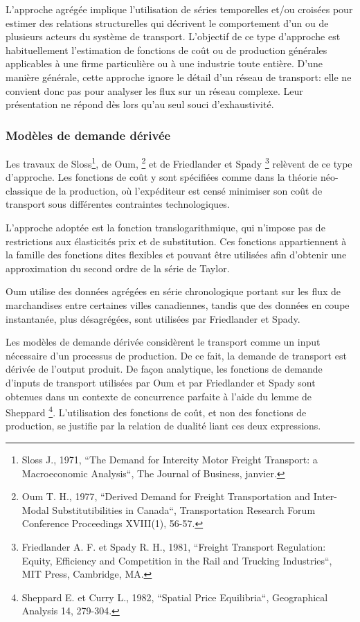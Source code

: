L'approche agrégée implique l'utilisation de séries temporelles
et/ou croisées pour estimer des relations structurelles qui
décrivent le comportement d'un ou de plusieurs acteurs du système
de transport. L'objectif de ce type d'approche est habituellement
l'estimation de fonctions de coût ou de production générales
applicables à une firme particulière ou à une industrie toute
entière. D'une manière générale, cette approche ignore le détail
d'un réseau de transport: elle ne convient donc pas pour analyser
les flux sur un réseau complexe. Leur présentation ne répond dès
lors qu'au seul souci d'exhaustivité.

\subsubsection{Mod\`eles de demande d\'eriv\'ee}


Les travaux de Sloss\footnote{Sloss J., 1971, ``The Demand for Intercity Motor
Freight Transport: a Macroeconomic Analysis``, The Journal of Business,
janvier.}, de Oum, \footnote{ Oum T. H., 1977, ``Derived Demand for Freight
Transportation and Inter-Modal Substitutibilities in Canada``, Transportation
Research Forum Conference Proceedings XVIII(1), 56-57.} et de Friedlander et
 Spady \footnote{ Friedlander A. F. et Spady R. H., 1981, ``Freight
Transport Regulation: Equity, Efficiency and Competition in the
Rail and Trucking Industries``, MIT Press, Cambridge, MA.} relèvent
de ce type d'approche. Les fonctions de coût y sont spécifiées
comme dans la théorie néo-classique de la production, où
l'expéditeur est censé minimiser son coût de transport sous
différentes contraintes technologiques.


L'approche adoptée est la fonction translogarithmique, qui n'impose
pas de restrictions aux élasticités prix et de substitution. Ces
fonctions appartiennent à la famille des fonctions dites flexibles
et pouvant être utilisées afin d'obtenir une approximation du
second ordre de la série de Taylor.


Oum utilise des données agrégées en série chronologique portant sur
les flux de marchandises entre certaines villes canadiennes, tandis
que des données en coupe instantanée, plus désagrégées, sont
utilisées par Friedlander et Spady.


Les modèles de demande dérivée considèrent le transport comme un
input nécessaire d'un processus de production. De ce fait, la
demande de transport est dérivée de l'output produit. De façon
analytique, les fonctions de demande d'inputs de transport
utilisées par Oum et par Friedlander et Spady sont obtenues dans un
contexte de concurrence parfaite à l'aide du lemme de Sheppard
\footnote{ Sheppard E. et Curry L., 1982, ``Spatial Price
Equilibria``, Geographical Analysis 14, 279-304.}. L'utilisation
des fonctions de coût, et non des fonctions de production, se
justifie par la relation de dualité liant ces deux expressions.


